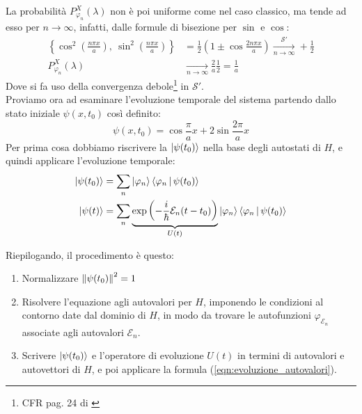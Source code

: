 \documentclass[../../FisicaTeorica.tex]{subfiles}
\begin{document}
La probabilità $P^X_{\varphi_n}(\lambda)$ non è poi uniforme come nel caso classico, ma tende ad esso per $n\to\infty$, infatti, dalle formule di bisezione per $\sin$ e $\cos$:
\begin{align*}
\left\{\cos^2 \left(\frac{n\pi x}{a}\right),\>
\sin^2 \left(\frac{n\pi x}{a}\right)\right\} &= \frac{1}{2}\left(1\pm \cos \frac{2n\pi x}{a} \right)\xrightarrow[n\to\infty]{\mathcal{S}'} +\frac{1}{2}\\
P_{\varphi_n}^X(\lambda) &\xrightarrow[n\to\infty]{} \frac{2}{a}\frac{1}{2} = \frac{1}{a}
\end{align*} %
Dove si fa uso della convergenza debole\footnote{CFR pag. 24 di \cite{spazi_hilbert}} in $\mathcal{S}'$.\\

Proviamo ora ad esaminare l'evoluzione temporale del sistema partendo dallo stato iniziale $\psi(x,t_0)$ così definito:
\begin{equation}
\psi(x,t_0) = \cos\frac{\pi}{a} x+2\sin\frac{2\pi}{a}x
\label{eqn:stato_iniziale}
\end{equation}
Per prima cosa dobbiamo riscrivere la $\Ket{\psi(t_0)}$ nella base degli autostati di $H$, e quindi applicare l'evoluzione temporale:
\begin{align}
\Ket{\psi(t_0)} &= \sum_n \Ket{\varphi_n}\Braket{\varphi_n|\psi(t_0)}\nonumber \\
\label{eqn:evoluzione_autovalori}
\Ket{\psi(t)} &= \sum_n \underbrace{\exp\left(-\frac{i}{\hbar}\mathcal{E}_n(t-t_0)\right)}_{U(t)}\Ket{\varphi_n}\Braket{\varphi_n|\psi(t_0)}
\end{align}

Riepilogando, il procedimento è questo:
\begin{enumerate}
\item Normalizzare $\left\lVert\psi(t_0)\right\rVert^2 = 1$\\
\item Risolvere l'equazione agli autovalori per $H$, imponendo le condizioni al contorno date dal dominio di $H$, in modo da trovare le autofunzioni $\varphi_{\mathcal{E}_n}$ associate agli autovalori $\mathcal{E}_n$.
\item Scrivere $\Ket{\psi(t_0)}$ e l'operatore di evoluzione $U(t)$ in termini di autovalori e autovettori di $H$, e poi applicare la formula (\ref{eqn:evoluzione_autovalori}).
\end{enumerate}
\end{document}

